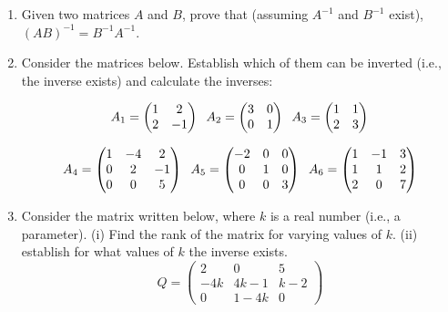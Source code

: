 \documentclass[fleqn]{article}
\begin{document}
\begin{enumerate}
    \item  Given two matrices $A$ and $B$,  prove that (assuming $A^{-1}$ and $B^{-1}$ exist),
    $(AB)^{-1} = B^{-1}A^{-1} $.  


    \item  Consider the matrices below. Establish which of them can be inverted (i.e., the inverse exists) and calculate the inverses: 

      $$A_1 = 
      \begin{pmatrix}
        1 & 2 \\
        2 & -1
      \end{pmatrix}\hskip 0.2truecm 
      A_2=\begin{pmatrix}
        3 & 0 \\
        0 & 1
      \end{pmatrix}\hskip 0.2truecm
      A_3=\begin{pmatrix}
        1 & 1 \\
        2 & 3
      \end{pmatrix}
      $$

      $$A_4 = 
      \begin{pmatrix}
        1 & -4 & 2 \\
        0 & 2 & -1 \\
        0 & 0 & 5
      \end{pmatrix}\hskip 0.2truecm 
      A_5=\begin{pmatrix}
        -2 & 0 & 0 \\
        0 & 1 & 0 \\
        0 & 0 & 3
      \end{pmatrix}\hskip 0.2truecm
      A_6=\begin{pmatrix}
        1 & -1 & 3 \\
        1 & 1 & 2 \\
        2 & 0 & 7
      \end{pmatrix}
      $$
    
    
    \item  Consider the matrix written below, where $k$ is a real number (i.e., a parameter). (i) Find the rank of the matrix for varying values of $k$. (ii) establish for what values of $k$ the inverse exists. 
      $$
      Q = 
      \begin{pmatrix}
      2 & 0 & 5 \\
      -4k & 4k-1 & k-2 \\
      0 & 1-4k & 0
      \end{pmatrix}
      $$

  \end{enumerate}
\end{document}
